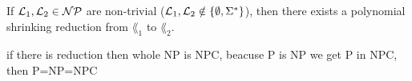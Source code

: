 If $\mathcal{L}_1, \mathcal{L}_2 \in \mathcal{N}\mathcal{P}$ are non-trivial ($\mathcal{L}_1, \mathcal{L}_2 \notin \{\emptyset, \Sigma^*\}$), then there exists a polynomial shrinking
reduction from $\lang_1$ to $\lang_2$.


if there is reduction then whole NP is NPC, beacuse P is NP we get P in NPC, then P=NP=NPC